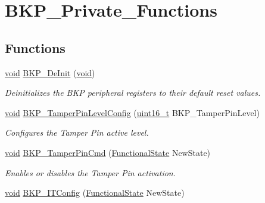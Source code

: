 \hypertarget{group___b_k_p___private___functions}{}\section{B\+K\+P\+\_\+\+Private\+\_\+\+Functions}
\label{group___b_k_p___private___functions}
\subsection*{Functions}
\begin{DoxyCompactItemize}
\item 
\hyperlink{usb__devapi_8h_afabf60e7f57651d6d595a02c75f07cd0}{void} \hyperlink{group___b_k_p___private___functions_gaabff4d8f5ebf4fd9a840bcc9042ca226}{B\+K\+P\+\_\+\+De\+Init} (\hyperlink{usb__devapi_8h_afabf60e7f57651d6d595a02c75f07cd0}{void})
\begin{DoxyCompactList}\small\item\em Deinitializes the B\+KP peripheral registers to their default reset values. \end{DoxyCompactList}\item 
\hyperlink{usb__devapi_8h_afabf60e7f57651d6d595a02c75f07cd0}{void} \hyperlink{group___b_k_p___private___functions_gae216446d641d075fb575ce6dbe2ff4c1}{B\+K\+P\+\_\+\+Tamper\+Pin\+Level\+Config} (\hyperlink{_p_e___types_8h_a1f1825b69244eb3ad2c7165ddc99c956}{uint16\+\_\+t} B\+K\+P\+\_\+\+Tamper\+Pin\+Level)
\begin{DoxyCompactList}\small\item\em Configures the Tamper Pin active level. \end{DoxyCompactList}\item 
\hyperlink{usb__devapi_8h_afabf60e7f57651d6d595a02c75f07cd0}{void} \hyperlink{group___b_k_p___private___functions_ga3a0cdff9ad8238ade2c67e2b70f530ac}{B\+K\+P\+\_\+\+Tamper\+Pin\+Cmd} (\hyperlink{agilefox_2library_2inc_2stm32f10x__type_8h_ac9a7e9a35d2513ec15c3b537aaa4fba1}{Functional\+State} New\+State)
\begin{DoxyCompactList}\small\item\em Enables or disables the Tamper Pin activation. \end{DoxyCompactList}\item 
\hyperlink{usb__devapi_8h_afabf60e7f57651d6d595a02c75f07cd0}{void} \hyperlink{group___b_k_p___private___functions_gab8dbd0c4773f6edb98a28c8ff6a2ead0}{B\+K\+P\+\_\+\+I\+T\+Config} (\hyperlink{agilefox_2library_2inc_2stm32f10x__type_8h_ac9a7e9a35d2513ec15c3b537aaa4fba1}{Functional\+State} New\+State)

\end{DoxyCompactItemize}
